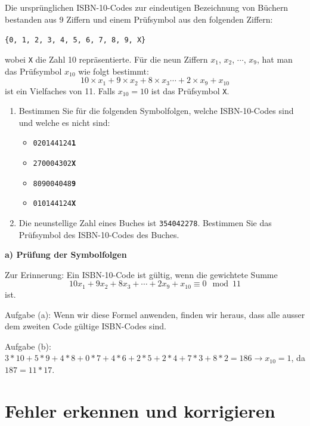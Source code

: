 \begin{myexercise}
    Die ursprünglichen \gls{ISBN}-10-Codes zur eindeutigen Bezeichnung von Büchern bestanden aus 9 Ziffern und einem Prüfsymbol aus den folgenden Ziffern:

    \texttt{\{0, 1, 2, 3, 4, 5, 6, 7, 8, 9, X\}}

    wobei \texttt{X} die Zahl 10 repräsentierte. Für die neun Ziffern $x_1$, $x_2$, $\cdots$, $x_9$, hat man das Prüfsymbol $x_{10}$ wie folgt bestimmt:
    \[10\times x_1+9\times x_2+8\times x_3\cdots+2\times x_9 + x_{10}\]
    ist ein Vielfaches von 11. Falls $x_{10} = 10$ ist das Prüfsymbol \texttt{X}.
    \begin{enumerate}
        \item Bestimmen Sie für die folgenden Symbolfolgen, welche \gls{ISBN}-10-Codes sind und welche es nicht sind:
              \begin{itemize}
                  \item \texttt{020144124\textbf{1}}
                  \item \texttt{270004302\textbf{X}}
                  \item \texttt{809004048\textbf{9}}
                  \item \texttt{010144124\textbf{X}}
              \end{itemize}
        \item Die neunstellige Zahl eines Buches ist \texttt{354042278}. Bestimmen Sie das Prüfsymbol des \gls{ISBN}-10-Codes des Buches.
    \end{enumerate}
    \begin{myanswer}
        \textbf{a) Prüfung der Symbolfolgen}

        Zur Erinnerung: Ein \gls{ISBN}-10-Code ist gültig, wenn die gewichtete Summe
        \[
            10x_1 + 9x_2 + 8x_3 + \cdots + 2x_9 + x_{10} \equiv 0 \mod 11
        \]
        ist.

        Aufgabe (a): Wenn wir diese Formel anwenden, finden wir heraus, dass alle ausser dem zweiten Code gültige \gls{ISBN}-Codes sind.

        Aufgabe (b): $3*10+5*9+4*8+0*7+4*6+2*5+2*4+7*3+8*2=186 \rightarrow x_{10}=1$, da $187=11*17$.

    \end{myanswer}

\end{myexercise}

\section{Fehler erkennen und korrigieren}

